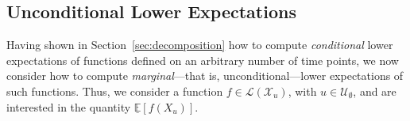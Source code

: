 \documentclass[10pt,a4paper]{paper}
\theoremstyle{definition}
\newtheorem{proposition}[theorem]{Proposition}
\newtheorem{corollary}[theorem]{Corollary}
\newcommand{\reals}{\mathbb{R}}
\newcommand{\realspos}{\reals_{>0}}
\newcommand{\realsnonneg}{\reals_{\geq 0}}
\newcommand{\states}{\mathcal{X}}
\newcommand{\processes}{\mathbb{P}}
\newcommand{\wprocesses}{\processes^{\mathrm{W}}}
\newcommand{\gambles}{\mathcal{L}}
\newcommand{\rateset}{\mathcal{Q}}
\newcommand{\lrate}{\underline{Q}}
\newcommand{\norm}[1]{\left\lVert #1 \right\rVert}
\begin{document}
%
%

\subsection{Unconditional Lower Expectations}\label{sec:marginal_lower_exp}

Having shown in Section~\ref{sec:decomposition} how to compute \emph{conditional} lower expectations of functions defined on an arbitrary number of time points, we now consider how to compute \emph{marginal}---that is, unconditional---lower expectations of such functions. Thus, we consider a function $f\in\gambles(\states_u)$, with $u\in\mathcal{U}_{\emptyset}$, and are interested in the quantity $\underline{\mathbb{E}}[f(X_u)]$.
\end{document}
